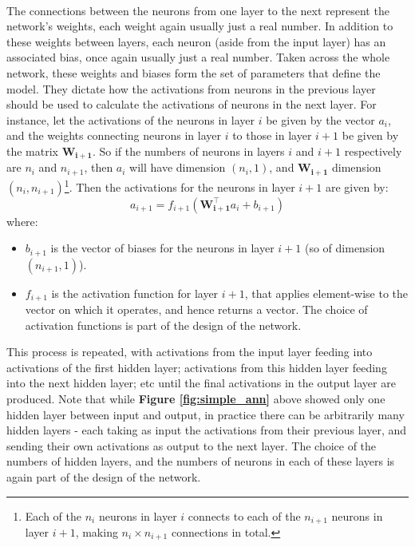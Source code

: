 \documentclass[11pt]{article} %
\theoremstyle{plain}
\theoremstyle{definition}
\begin{document}
\\
\noindent
The connections between the neurons from one layer to the next represent the network's weights, each weight again usually just a real number. In addition to these weights between layers, each neuron (aside from the input layer) has an associated bias, once again usually just a real number. Taken across the whole network, these weights and biases form the set of parameters that define the model. They dictate how the activations from neurons in the previous layer should be used to calculate the activations of neurons in the next layer. For instance, let the activations of the neurons in layer \(i\) be given by the vector \(a_i\), and the weights connecting neurons in layer \(i\) to those in layer \(i+1\) be given by the matrix \(\mathbf{W_{i+1}}\). So if the numbers of neurons in layers \(i\) and \(i+1\) respectively are \(n_i\) and \(n_{i+1}\), then \(a_i\) will have dimension \((n_i,1)\), and \(\mathbf{W_{i+1}}\) dimension \((n_i,n_{i+1})\)\footnote{Each of the \(n_i\) neurons in layer \(i\) connects to each of the \(n_{i+1}\) neurons in layer \(i+1\), making \({n_i}\times{n_{i+1}}\) connections in total.}. Then the activations for the neurons in layer \(i+1\) are given by:
\[a_{i+1} = f_{i+1}(\mathbf{W_{i+1}^{\top}}a_i + b_{i+1}) \]
where:
\begin{itemize}
  \item \(b_{i+1}\) is the vector of biases for the neurons in layer \(i+1\) (so of dimension \((n_{i+1},1)\)). 
  \item \(f_{i+1}\) is the activation function for layer \(i+1\), that applies element-wise to the vector on which it operates, and hence returns a vector. The choice of activation functions is part of the design of the network.   
\end{itemize}
This process is repeated, with activations from the input layer feeding into activations of the first hidden layer; activations from this hidden layer feeding into the next hidden layer; etc until the final activations in the output layer are produced. Note that while \textbf{Figure \ref{fig:simple_ann}} above showed only one hidden layer between input and output, in practice there can be arbitrarily many hidden layers - each taking as input the activations from their previous layer, and sending their own activations as output to the next layer. The choice of the numbers of hidden layers, and the numbers of neurons in each of these layers is again part of the design of the network.   
\end{document}
